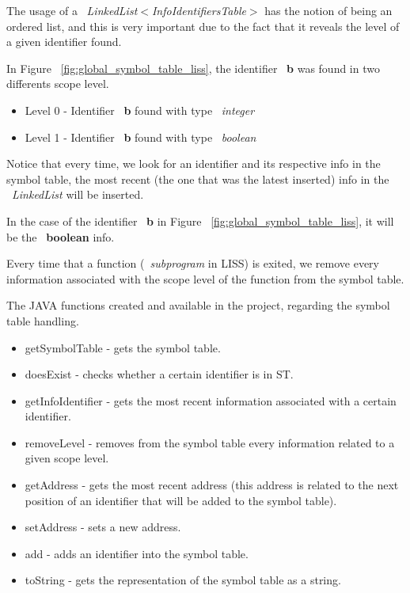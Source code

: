 \documentclass[
  oneside,
  11pt, a4paper,
  footinclude=true,
  headinclude=true,
  cleardoublepage=empty
]{scrbook}
\begin{document}
The usage of a ~\textit{LinkedList$<$InfoIdentifiersTable$>$} has the notion of being an ordered list, and this is very important due to the fact that it reveals the level of a given identifier found.

In Figure ~\ref{fig:global_symbol_table_liss}, the identifier ~\textbf{b} was found in two differents scope level.
\begin{itemize}
\item Level 0 - Identifier ~\textbf{b} found with type ~\textit{integer}
\item Level 1 - Identifier ~\textbf{b} found with type ~\textit{boolean}
\end{itemize}

Notice that every time, we look for an identifier and its respective info in the symbol table, the most recent (the one that was the latest inserted) info in the ~\textit{LinkedList} will be inserted. 

In the case of the identifier ~\textbf{b} in Figure ~\ref{fig:global_symbol_table_liss}, it will be the ~\textbf{boolean} info.



Every time that a function (~\textit{subprogram} in LISS) is exited, we remove every information associated with the scope level of the function from the symbol table. 

The JAVA functions created and available in the project, regarding the symbol table handling.

\begin{itemize}
\item getSymbolTable - gets the symbol table.
\item doesExist - checks whether a certain identifier is in ST.
\item getInfoIdentifier - gets the most recent information associated with a certain identifier.
\item removeLevel - removes from the symbol table every information related to a given scope level.
\item getAddress - gets the most recent address (this address is related to the next position of an identifier that will be added to the symbol table).
\item setAddress - sets a new address.
\item add - adds an identifier into the symbol table.
\item toString - gets the representation of the symbol table as a string.
\end{itemize}
\end{document}
